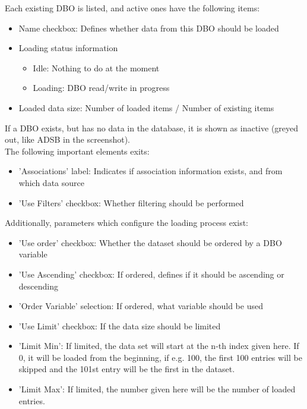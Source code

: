 Each existing DBO is listed, and active ones have the following items:

\begin{itemize}
 \item Name checkbox: Defines whether data from this DBO should be loaded
 \item Loading status information
  \begin{itemize}
  \item Idle: Nothing to do at the moment
  \item Loading: DBO read/write in progress
  \end{itemize}
 \item Loaded data size: Number of loaded items / Number of existing items
\end{itemize}

If a DBO exists, but has no data in the database, it is shown as inactive (greyed out, like ADSB in the screenshot).\\

The following important elements exits:
\begin{itemize}
 \item 'Associations' label: Indicates if association information exists, and from which data source
 \item 'Use Filters' checkbox: Whether filtering should be performed
\end{itemize}


Additionally, parameters which configure the loading process exist:

\begin{itemize}
 \item 'Use order' checkbox: Whether the dataset should be ordered by a DBO variable
 \item 'Use Ascending' checkbox: If ordered, defines if it should be ascending or descending
 \item 'Order Variable' selection: If ordered, what variable should be used
 \item 'Use Limit' checkbox: If the data size should be limited
 \item 'Limit Min': If limited, the data set will start at the n-th index given here. If 0, it will be loaded from the beginning, if e.g. 100, the first 100 entries will be skipped and the 101st entry will be the first in the dataset.
\item 'Limit Max': If limited, the number given here will be the number of loaded entries.
\end{itemize}

